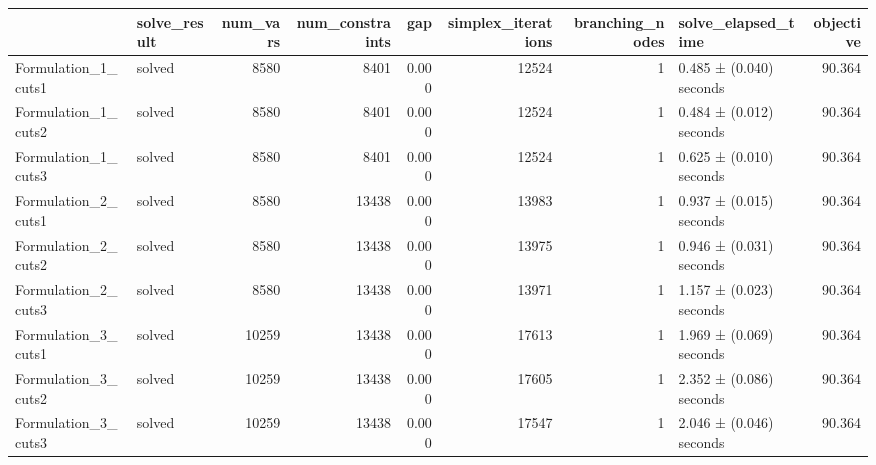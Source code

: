\begin{tabular}{llrrrrrlr}
\toprule
 & solve_result & num_vars & num_constraints & gap & simplex_iterations & branching_nodes & solve_elapsed_time & objective \\
\midrule
Formulation_1_cuts1 & solved & 8580 & 8401 & 0.000 & 12524 & 1 & 0.485 ± (0.040) seconds & 90.364 \\
Formulation_1_cuts2 & solved & 8580 & 8401 & 0.000 & 12524 & 1 & 0.484 ± (0.012) seconds & 90.364 \\
Formulation_1_cuts3 & solved & 8580 & 8401 & 0.000 & 12524 & 1 & 0.625 ± (0.010) seconds & 90.364 \\
Formulation_2_cuts1 & solved & 8580 & 13438 & 0.000 & 13983 & 1 & 0.937 ± (0.015) seconds & 90.364 \\
Formulation_2_cuts2 & solved & 8580 & 13438 & 0.000 & 13975 & 1 & 0.946 ± (0.031) seconds & 90.364 \\
Formulation_2_cuts3 & solved & 8580 & 13438 & 0.000 & 13971 & 1 & 1.157 ± (0.023) seconds & 90.364 \\
Formulation_3_cuts1 & solved & 10259 & 13438 & 0.000 & 17613 & 1 & 1.969 ± (0.069) seconds & 90.364 \\
Formulation_3_cuts2 & solved & 10259 & 13438 & 0.000 & 17605 & 1 & 2.352 ± (0.086) seconds & 90.364 \\
Formulation_3_cuts3 & solved & 10259 & 13438 & 0.000 & 17547 & 1 & 2.046 ± (0.046) seconds & 90.364 \\
\bottomrule
\end{tabular}
